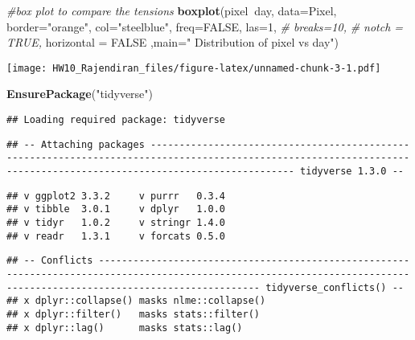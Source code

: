 \documentclass[]{article}
\newenvironment{Shaded}{\begin{snugshade}}{\end{snugshade}}
\newcommand{\CommentTok}[1]{\textcolor[rgb]{0.56,0.35,0.01}{\textit{#1}}}
\newcommand{\DataTypeTok}[1]{\textcolor[rgb]{0.13,0.29,0.53}{#1}}
\newcommand{\DecValTok}[1]{\textcolor[rgb]{0.00,0.00,0.81}{#1}}
\newcommand{\KeywordTok}[1]{\textcolor[rgb]{0.13,0.29,0.53}{\textbf{#1}}}
\newcommand{\NormalTok}[1]{#1}
\newcommand{\OperatorTok}[1]{\textcolor[rgb]{0.81,0.36,0.00}{\textbf{#1}}}
\newcommand{\OtherTok}[1]{\textcolor[rgb]{0.56,0.35,0.01}{#1}}
\newcommand{\StringTok}[1]{\textcolor[rgb]{0.31,0.60,0.02}{#1}}
\begin{document}
\begin{Shaded}
\begin{Highlighting}[]
\CommentTok{#box plot to compare the tensions}
\KeywordTok{boxplot}\NormalTok{(pixel}\OperatorTok{~}\NormalTok{day, }\DataTypeTok{data=}\NormalTok{Pixel,}
       \DataTypeTok{border=}\StringTok{"orange"}\NormalTok{, }
       \DataTypeTok{col=}\StringTok{"steelblue"}\NormalTok{,}
       \DataTypeTok{freq=}\OtherTok{FALSE}\NormalTok{,}
       \DataTypeTok{las=}\DecValTok{1}\NormalTok{, }
       \CommentTok{# breaks=10,}
       \CommentTok{# notch = TRUE,}
       \DataTypeTok{horizontal =} \OtherTok{FALSE}\NormalTok{ ,}\DataTypeTok{main=}\StringTok{" Distribution of pixel vs day"}\NormalTok{)}
\end{Highlighting}
\end{Shaded}

\texttt{[image: HW10\_Rajendiran\_files/figure-latex/unnamed-chunk-3-1.pdf]}

\begin{Shaded}
\begin{Highlighting}[]
\KeywordTok{EnsurePackage}\NormalTok{(}\StringTok{"tidyverse"}\NormalTok{)}
\end{Highlighting}
\end{Shaded}

\begin{verbatim}
## Loading required package: tidyverse
\end{verbatim}

\begin{verbatim}
## -- Attaching packages --------------------------------------------------------------------------------------------------------------------------------------------------------------------- tidyverse 1.3.0 --
\end{verbatim}

\begin{verbatim}
## v ggplot2 3.3.2     v purrr   0.3.4
## v tibble  3.0.1     v dplyr   1.0.0
## v tidyr   1.0.2     v stringr 1.4.0
## v readr   1.3.1     v forcats 0.5.0
\end{verbatim}

\begin{verbatim}
## -- Conflicts ------------------------------------------------------------------------------------------------------------------------------------------------------------------------ tidyverse_conflicts() --
## x dplyr::collapse() masks nlme::collapse()
## x dplyr::filter()   masks stats::filter()
## x dplyr::lag()      masks stats::lag()
\end{verbatim}
\end{document}
